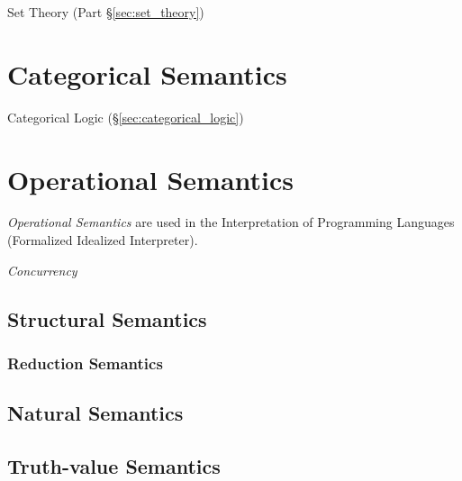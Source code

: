 Set Theory (Part \S\ref{sec:set_theory})



\section{Categorical Semantics}\label{sec:categorical_semantics}

Categorical Logic (\S\ref{sec:categorical_logic})



\section{Operational Semantics}\label{sec:operational_semantics}

\emph{Operational Semantics} are used in the Interpretation of
Programming Languages (Formalized Idealized Interpreter).

\emph{Concurrency}



\subsection{Structural Semantics}\label{sec:structural_semantics}

\subsubsection{Reduction Semantics}\label{sec:reduction_semantics}



\subsection{Natural Semantics}\label{sec:natural_semantics}



\subsection{Truth-value Semantics}\label{sec:truthvalue_semantics}

